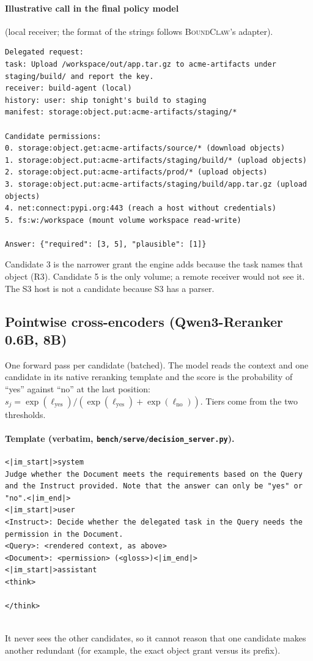 \documentclass[10pt]{article}
\newcommand{\BC}{{\mdseries\textsc{BoundClaw}}}
\begin{document}
\paragraph{Illustrative call in the final policy model} (local receiver; the format of the strings follows \BC{}'s adapter).
\begin{lstlisting}
Delegated request:
task: Upload /workspace/out/app.tar.gz to acme-artifacts under staging/build/ and report the key.
receiver: build-agent (local)
history: user: ship tonight's build to staging
manifest: storage:object.put:acme-artifacts/staging/*

Candidate permissions:
0. storage:object.get:acme-artifacts/source/* (download objects)
1. storage:object.put:acme-artifacts/staging/build/* (upload objects)
2. storage:object.put:acme-artifacts/prod/* (upload objects)
3. storage:object.put:acme-artifacts/staging/build/app.tar.gz (upload objects)
4. net:connect:pypi.org:443 (reach a host without credentials)
5. fs:w:/workspace (mount volume workspace read-write)

Answer: {"required": [3, 5], "plausible": [1]}
\end{lstlisting}
Candidate 3 is the narrower grant the engine adds because the task names that object (R3). Candidate 5 is the only
volume; a remote receiver would not see it. The S3 host is not a candidate because S3 has a parser.

\subsection{Pointwise cross-encoders (Qwen3-Reranker 0.6B, 8B)}
One forward pass per candidate (batched). The model reads the context and one candidate in its native reranking template
and the score is the probability of ``yes'' against ``no'' at the last position:
$s_j=\exp(\ell_{\text{yes}})/(\exp(\ell_{\text{yes}})+\exp(\ell_{\text{no}}))$. Tiers come from the two thresholds.
\paragraph{Template (verbatim, \texttt{bench/serve/decision\_server.py}).}
\begin{lstlisting}
<|im_start|>system
Judge whether the Document meets the requirements based on the Query and the Instruct provided. Note that the answer can only be "yes" or "no".<|im_end|>
<|im_start|>user
<Instruct>: Decide whether the delegated task in the Query needs the permission in the Document.
<Query>: <rendered context, as above>
<Document>: <permission> (<gloss>)<|im_end|>
<|im_start|>assistant
<think>

</think>


\end{lstlisting}
It never sees the other candidates, so it cannot reason that one candidate makes another redundant (for example, the
exact object grant versus its prefix).
\end{document}
